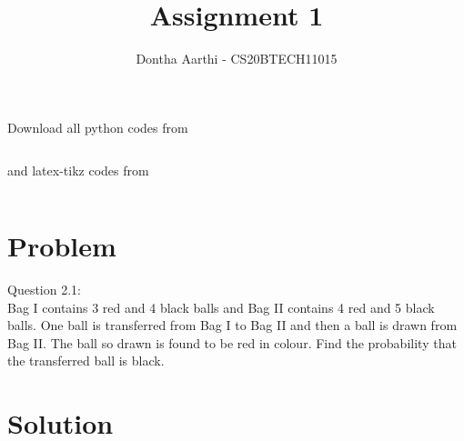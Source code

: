 \documentclass[journal,12pt,twocolumn]{IEEEtran}
\begin{document}
     \def\rightbox#1{\makebox[0in][r]{#1}}
     \def\centbox#1{\makebox[0in]{#1}}
     \def\topbox#1{\raisebox{-\baselineskip}[0in][0in]{#1}}
     \def\midbox#1{\raisebox{-0.5\baselineskip}[0in][0in]{#1}}
\vspace{3cm}
\title{Assignment 1}
\author{Dontha Aarthi - CS20BTECH11015}
\maketitle
\newpage
\bigskip
\renewcommand{\thefigure}{\theenumi}
\renewcommand{\thetable}{\theenumi}
Download all python codes from 
\begin{lstlisting}

\end{lstlisting}
%
and latex-tikz codes from 
%
\begin{lstlisting}

\end{lstlisting}
\section{Problem}
Question 2.1:\\
Bag I contains 3 red and 4 black balls and
Bag II contains 4 red and 5 black balls. One
ball is transferred from Bag I to Bag II and
then a ball is drawn from Bag II. The ball
so drawn is found to be red in colour. Find
the probability that the transferred ball is black.


\section{Solution}
\end{document}
